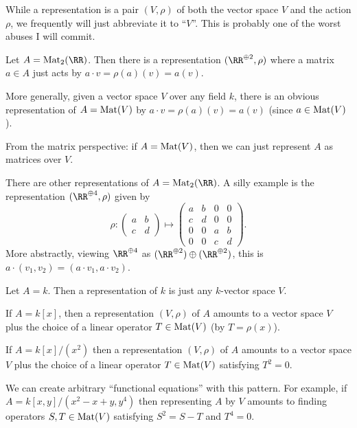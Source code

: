\begin{abuse}
	While a representation is a pair $(V, \rho)$
	of both the vector space $V$ and the action $\rho$,
	we frequently will just abbreviate it to ``$V$''.
	This is probably one of the worst abuses I will commit.
\end{abuse}

\begin{example}
	\listhack
	\begin{enumerate}[(a)]
		\ii Let $A = \Mat_2(\RR)$.
		Then there is a representation $(\RR^{\oplus 2}, \rho)$
		where a matrix $a \in A$ just acts by $a \cdot v = \rho(a)(v) = a(v)$.

		\ii More generally, given a vector space $V$ over any field $k$,
		there is an obvious representation of $A = \mathrm{Mat}(V)$
		by $a \cdot v = \rho(a)(v) = a(v)$ (since $a \in \mathrm{Mat}(V)$).

		From the matrix perspective: if $A = \mathrm{Mat}(V)$,
		then we can just represent $A$ as matrices over $V$.

		\ii There are other representations of $A = \Mat_2(\RR)$.
		A silly example is the representation $(\RR^{\oplus 4}, \rho)$ given by
		\[
			\rho : 
			\begin{pmatrix} a & b \\ c & d \end{pmatrix} 
			\mapsto
			\begin{pmatrix} a & b & 0 & 0 \\ c & d & 0 & 0 \\
				0 & 0 & a & b \\ 0 & 0 & c & d \end{pmatrix} .
		\]
		More abstractly, viewing $\RR^{\oplus 4}$ as
		$(\RR^{\oplus 2}) \oplus (\RR^{\oplus 2})$,
		this is $a \cdot (v_1,v_2) = (a \cdot v_1, a \cdot v_2)$.
	\end{enumerate}
\end{example}

\begin{example}
	\listhack
	\begin{enumerate}[(a)]
		\ii Let $A = k$.
		Then a representation of $k$ is just any $k$-vector space $V$.

		\ii If $A = k[x]$,
		then a representation $(V, \rho)$ of $A$
		amounts to a vector space $V$ plus the choice of
		a linear operator $T \in \mathrm{Mat}(V)$ (by $T = \rho(x)$).

		\ii If $A = k[x] / (x^2)$
		then a representation $(V, \rho)$ of $A$
		amounts to a vector space $V$ plus the choice of
		a linear operator $T \in \mathrm{Mat}(V)$ satisfying $T^2 = 0$.

		\ii We can create arbitrary ``functional equations'' with this pattern.
		For example, if $A = k[x,y] / (x^2 - x+y, y^4)$
		then representing $A$ by $V$ amounts to finding operators
		$S, T \in \mathrm{Mat}(V)$ satisfying $S^2 = S-T$ and $T^4 = 0$.
	\end{enumerate}
\end{example}


